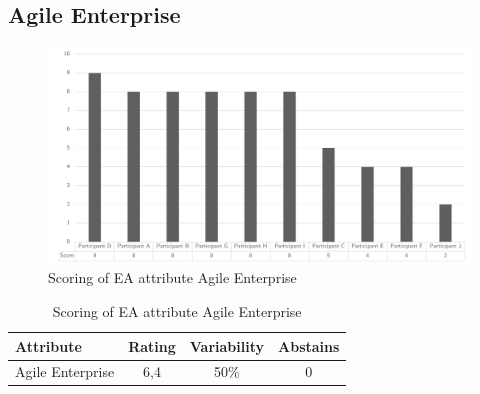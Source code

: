 \subsection{Agile Enterprise}
\begin{figure}[h!]
	\centering
	\includegraphics[width=0.9\linewidth]{images/scoreeaagileenterprise}
	\caption[Scoring of EA attribute Agile Enterprise]{Scoring of EA attribute Agile Enterprise}
	\label{fig:appscoringeaagileneterprise}
\end{figure}
\begin{table}[h!]
	\centering
	\begin{tabular}{p{}ccc}
		\toprule
		\textbf{Attribute} & \textbf{Rating} & \textbf{Variability} & \textbf{Abstains} \\
		\midrule
		Agile Enterprise & 6,4 & 50\% & 0 \\%
		\bottomrule
	\end{tabular}%
	\caption[Scoring of EA attribute Agile Enterprise]{Scoring of EA attribute Agile Enterprise}
	\label{tab:appscoringeaagileenterprise}%
\end{table}%
\newpage
